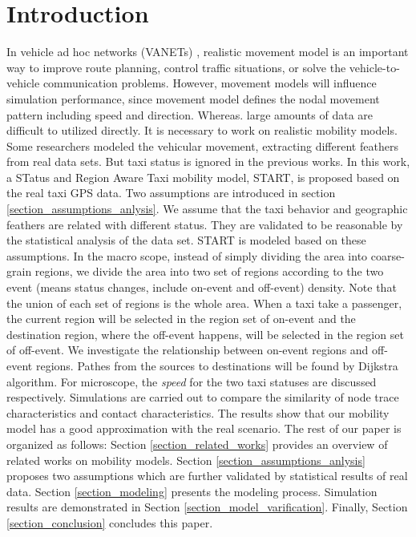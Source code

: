 \section{Introduction}
\label{section_introduction}

In vehicle ad hoc networks (VANETs) \cite{4068700}, realistic movement model is an important way to improve route planning, control traffic situations, or solve the vehicle-to-vehicle communication problems. However, movement models will influence simulation performance, since movement model defines the nodal movement pattern including speed and direction. Whereas. large amounts of data are difficult to utilized directly. It is necessary to work on realistic mobility models. Some researchers \cite{KimKotz-99,HuangZhu-88} modeled the vehicular movement, extracting different feathers from real data sets. But taxi status is ignored in the previous works.
In this work, a STatus and Region Aware Taxi mobility model, START, is proposed based on the real taxi GPS data. Two assumptions are introduced in section \ref{section_assumptions_anlysis}. We assume that the taxi behavior and geographic feathers are related with different status. They are validated to be reasonable by the statistical analysis of the data set.
START is modeled based on these assumptions. In the macro scope, instead of simply dividing the area into coarse-grain regions, we divide the area into two set of regions according to the two event (means status changes, include on-event and off-event) density. Note that the union of each set of regions is the whole area. When a taxi take a passenger, the current region will be selected in the region set of on-event and the destination region, where the off-event happens, will be selected in the region set of off-event. We investigate the relationship between on-event regions and off-event regions. Pathes from the sources to destinations will be found by Dijkstra algorithm. For microscope, the \emph{speed} for the two taxi statuses are discussed respectively.
Simulations are carried out to compare the similarity of node trace characteristics and contact characteristics. The results show that our mobility model has a good approximation with the real scenario.
The rest of our paper is organized as follows: Section \ref{section_related_works} provides an overview of related works on mobility models. Section \ref{section_assumptions_anlysis} proposes two assumptions which are further validated by statistical results of real data. Section \ref{section_modeling} presents the modeling process. Simulation results are demonstrated in Section \ref{section_model_varification}. Finally, Section \ref{section_conclusion} concludes this paper.


